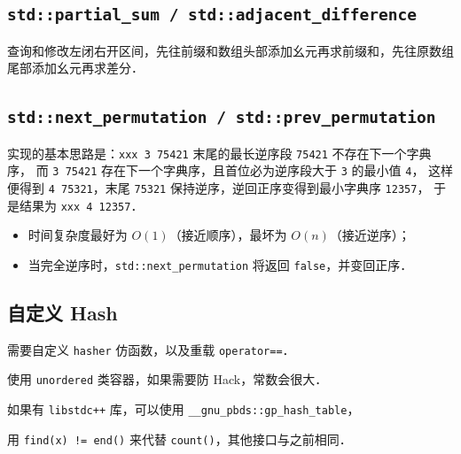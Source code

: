 

\subsection{{\tt std::partial\_sum / std::adjacent\_difference}}

查询和修改左闭右开区间，先往前缀和数组头部添加幺元再求前缀和，先往原数组尾部添加幺元再求差分．



\subsection{{\tt std::next\_permutation / std::prev\_permutation}}

实现的基本思路是：{\tt xxx 3 75421} 末尾的最长逆序段 {\tt 75421} 不存在下一个字典序，
而 {\tt 3 75421} 存在下一个字典序，且首位必为逆序段大于 {\tt 3} 的最小值 {\tt 4}，
这样便得到 {\tt 4 75321}，末尾 {\tt 75321} 保持逆序，逆回正序变得到最小字典序 {\tt 12357}，
于是结果为 {\tt xxx 4 12357}．

\begin{itemize}[noitemsep]
    \item 时间复杂度最好为 $O(1)$（接近顺序），最坏为 $O(n)$（接近逆序）；
    \item 当完全逆序时，{\tt std::next\_permutation} 将返回 {\tt false}，并变回正序．
\end{itemize}



\subsection{自定义 Hash}

需要自定义 {\tt hasher} 仿函数，以及重载 {\tt operator==}．

使用 {\tt unordered} 类容器，如果需要防 Hack，常数会很大．

如果有 {\tt libstdc++} 库，可以使用 {\tt \_\_gnu\_pbds::gp\_hash\_table}，

用 {\tt find(x) != end()} 来代替 {\tt count()}，其他接口与之前相同．



